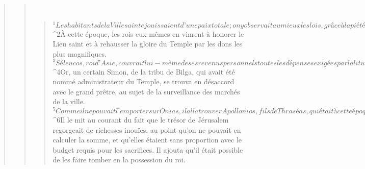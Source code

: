 \begin{verse}
\begin{verse}
         
      \bchapter{}
      \begin{verse}
${}^{1}Les habitants de la Ville sainte jouissaient d’une paix totale ; on y observait au mieux les lois, grâce à la piété du grand prêtre Onias et à sa haine du mal. 
${}^{2}À cette époque, les rois eux-mêmes en vinrent à honorer le Lieu saint et à rehausser la gloire du Temple par les dons les plus magnifiques. 
${}^{3}Séleucos, roi d’Asie, couvrait lui-même de ses revenus personnels toutes les dépenses exigées par la liturgie des sacrifices. 
${}^{4}Or, un certain Simon, de la tribu de Bilga, qui avait été nommé administrateur du Temple, se trouva en désaccord avec le grand prêtre, au sujet de la surveillance des marchés de la ville. 
${}^{5}Comme il ne pouvait l’emporter sur Onias, il alla trouver Apollonios, fils de Thraséas, qui était à cette époque le gouverneur militaire de Cœlé-Syrie et de Phénicie. 
${}^{6}Il le mit au courant du fait que le trésor de Jérusalem regorgeait de richesses inouïes, au point qu’on ne pouvait en calculer la somme, et qu’elles étaient sans proportion avec le budget requis pour les sacrifices. Il ajouta qu’il était possible de les faire tomber en la possession du roi.
      

\end{verse}
\end{verse}
\end{verse}
